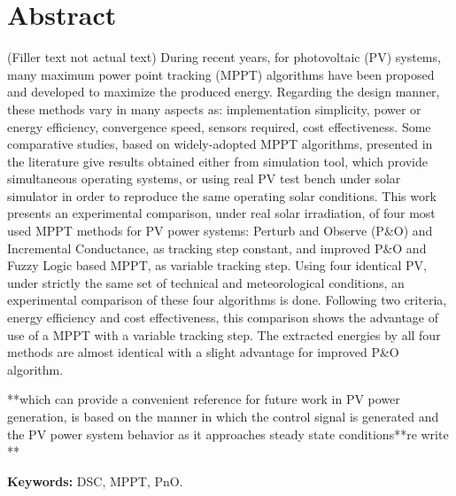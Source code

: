 \chapter*{Abstract}
\thispagestyle{begin}

(Filler text not actual text) During recent years, for photovoltaic (PV) systems, many maximum power point tracking (MPPT) algorithms have been proposed and developed to maximize the produced energy. Regarding the design manner, these methods vary in many aspects as: implementation simplicity, power or energy efficiency, convergence speed, sensors required, cost effectiveness. Some comparative studies, based on widely-adopted MPPT algorithms, presented in the literature give results obtained either from simulation tool, which provide simultaneous operating systems, or using real PV test bench under solar simulator in order to reproduce the same operating solar conditions. This work presents an experimental comparison, under real solar irradiation, of four most used MPPT methods for PV power systems: Perturb and Observe (P\&O) and Incremental Conductance, as tracking step constant, and improved P\&O and Fuzzy Logic based MPPT, as variable tracking step. Using four identical PV, under strictly the same set of technical and meteorological conditions, an experimental comparison of these four algorithms is done. Following two criteria, energy efficiency and cost effectiveness, this comparison shows the advantage of use of a MPPT with a variable tracking step. The extracted energies by all four methods are almost identical with a slight advantage for improved P\&O algorithm. \newline

**which can provide a convenient reference for future work in PV power generation, is based on the manner in which the control signal is generated and the PV power system behavior as it approaches steady state conditions**re write **

{\bf Keywords:} DSC, MPPT, PnO.
\acresetall
